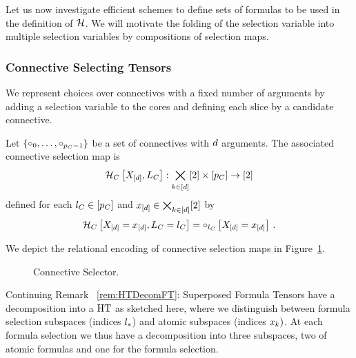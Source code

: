 Let us now investigate efficient schemes to define sets of formulas to be used in the definition of $\mathcal{H}$.
We will motivate the folding of the selection variable into multiple selection variables by compositions of selection maps.


\subsubsection{Connective Selecting Tensors}

We represent choices over connectives with a fixed number of arguments by adding a selection variable to the cores and defining each slice by a candidate connective.

\begin{definition}\label{def:connectiveSelector}
	Let $\{\circ_{0},\ldots,\circ_{p_{C}-1}\}$ be a set of connectives with $d$ arguments.
	The associated connective selection map is
		\[ \mathcal{H}_{C}\left[X_{[d]},L_{C}\right]
		: \bigtimes_{k\in[d]}[2] \times [p_{C}] \rightarrow [2] \]
	defined for each $l_{C}\in[p_{C}]$ and $x_{[d]}\in\bigtimes_{k\in[d]}[2]$ by 
		\[ \mathcal{H}_{C}\left[X_{[d]}=x_{[d]},L_{C}=l_{C}\right] 
		= \circ_{l_{C}}\left[X_{[d]}=x_{[d]}\right]  \, . \]
\end{definition}

We depict the relational encoding of connective selection maps in Figure~\ref{fig:connectiveSelector}.

\begin{figure}[h]
\begin{center}
	
\end{center}
\caption{Connective Selector.}
\label{fig:connectiveSelector}
\end{figure}


\begin{remark}\label{rem:HTDecomSFT}
	Continuing Remark ~\ref{rem:HTDecomFT}: 
	Superposed Formula Tensors have a decomposition into a $\mathrm{HT}$ as sketched here, where we distinguish between formula selection subspaces (indices $l_{s}$) and atomic subspaces (indices $x_{k})$.
	At each formula selection we thus have a decomposition into three subspaces, two of atomic formulas and one for the formula selection.
\end{remark}




